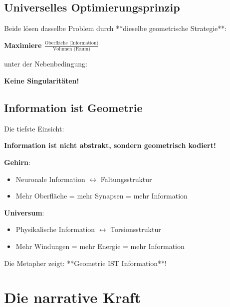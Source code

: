 	\subsection{Universelles Optimierungsprinzip}
	
	Beide lösen dasselbe Problem durch **dieselbe geometrische Strategie**:
	
	\begin{center}
		
		\textbf{Maximiere $\frac{\text{Oberfläche (Information)}}{\text{Volumen (Raum)}}$}
		
		\normalsize
		unter der Nebenbedingung:
		
		
		\textbf{Keine Singularitäten!}
	\end{center}
	
	\subsection{Information ist Geometrie}
	
	Die tiefste Einsicht:
	
	\begin{revolutionary}[Information = Geometrie]
		\textbf{Information ist nicht abstrakt, sondern geometrisch kodiert!}
		
		\vspace{0.3cm}
		
		\textbf{Gehirn}:
		\begin{itemize}
			\item Neuronale Information $\leftrightarrow$ Faltungsstruktur
			\item Mehr Oberfläche = mehr Synapsen = mehr Information
		\end{itemize}
		
		\textbf{Universum}:
		\begin{itemize}
			\item Physikalische Information $\leftrightarrow$ Torsionsstruktur
			\item Mehr Windungen = mehr Energie = mehr Information
		\end{itemize}
		
		\vspace{0.3cm}
		
		Die Metapher zeigt: **Geometrie IST Information**!
	\end{revolutionary}
	
	\section{Die narrative Kraft}
	
